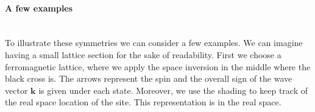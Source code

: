 \documentclass[../main.tex]{main.tex}
\begin{document}
\paragraph{A few examples}$~$\\

To illustrate these symmetries we can consider a few examples.
We can imagine having a small lattice section for the sake of readability. First we choose a ferromagnetic lattice, where we apply the space inversion
in the middle where the black cross is. The arrows represent the spin and the overall sign of the wave vector $\bm{k}$ is given under each state. Moreover, 
we use the shading to keep track of the real space location of the site. This representation is in the real space.\\
\begin{figure}[H]
    \centering
\end{figure}
\end{document}
